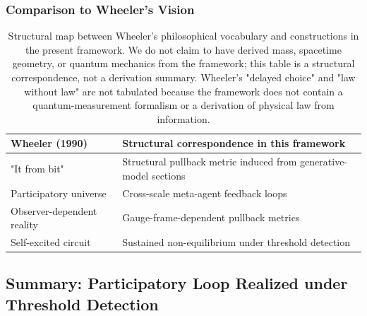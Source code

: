 \documentclass[11pt]{article}
\begin{document}
\subsubsection{Comparison to Wheeler's Vision}

\begin{table}[h]
\centering
\begin{tabularx}{\textwidth}{|l|X|}
\hline
\textbf{Wheeler (1990)} & \textbf{Structural correspondence in this framework} \\
\hline
"It from bit" & Structural pullback metric induced from generative-model sections \\
Participatory universe & Cross-scale meta-agent feedback loops \\
Observer-dependent reality & Gauge-frame-dependent pullback metrics \\
Self-excited circuit & Sustained non-equilibrium under threshold detection \\
\hline
\end{tabularx}
\caption{Structural map between Wheeler's philosophical vocabulary and constructions in the present framework. We do not claim to have derived mass, spacetime geometry, or quantum mechanics from the framework; this table is a structural correspondence, not a derivation summary. Wheeler's "delayed choice" and "law without law" are not tabulated because the framework does not contain a quantum-measurement formalism or a derivation of physical law from information.}
\label{tab:wheeler_comparison}
\end{table}

\subsection{Summary: Participatory Loop Realized under Threshold Detection}
\end{document}
